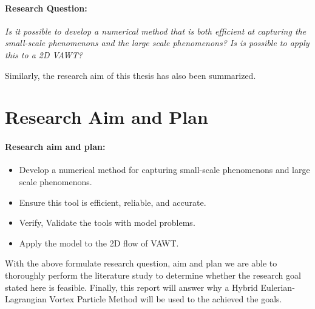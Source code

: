 \paragraph*{Research Question:} \textit{Is it possible to develop a numerical method that is both efficient at capturing the small-scale phenomenons and the large scale phenomenons? Is is possible to apply this to a 2D VAWT?}

Similarly, the research aim of this thesis has also been summarized.

\section{Research Aim and Plan}

\paragraph*{Research aim and plan:}
\begin{itemize}
\item Develop a numerical method for capturing small-scale phenomenons and large scale phenomenons.
\item Ensure this tool is efficient, reliable, and accurate.
\item Verify, Validate the tools with model problems.
\item Apply the model to the 2D flow of VAWT.
\end{itemize}

With the above formulate research question, aim and plan we are able to thoroughly perform the literature study to determine whether the research goal stated here is feasible. Finally, this report will answer why a Hybrid Eulerian-Lagrangian Vortex Particle Method will be used to the achieved the goals. 



